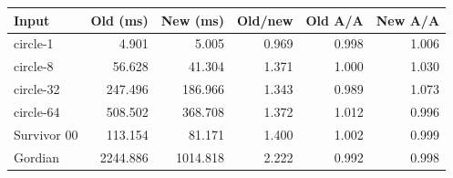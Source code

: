 \begin{tabular}{lrrrrr}
\toprule
Input & Old (ms) & New (ms) & Old/new & Old A/A & New A/A \\
\midrule
circle-1 & 4.901 & 5.005 & 0.969 & 0.998 & 1.006 \\
circle-8 & 56.628 & 41.304 & 1.371 & 1.000 & 1.030 \\
circle-32 & 247.496 & 186.966 & 1.343 & 0.989 & 1.073 \\
circle-64 & 508.502 & 368.708 & 1.372 & 1.012 & 0.996 \\
Survivor 00 & 113.154 & 81.171 & 1.400 & 1.002 & 0.999 \\
Gordian & 2244.886 & 1014.818 & 2.222 & 0.992 & 0.998 \\
\bottomrule
\end{tabular}
